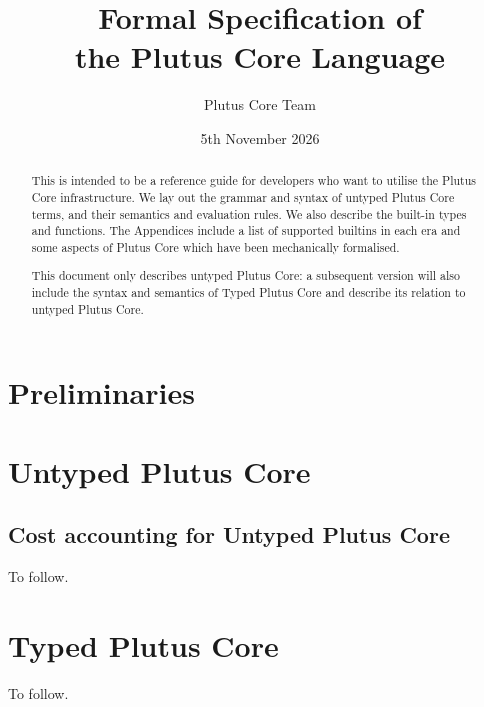 \documentclass[a4paper]{report}
\title{Formal Specification of\\the Plutus Core Language\\
  \vspace{5mm}
}
\date{5th November 2026}
\author{Plutus Core Team}
\begin{document}
\maketitle

\begin{abstract}
  This is intended to be a reference guide for developers who want to utilise
  the Plutus Core infrastructure.  We lay out the grammar and syntax of untyped
  Plutus Core terms, and their semantics and evaluation rules.  We also describe
  the built-in types and functions.  The Appendices include a list of supported
  builtins in each era and some aspects of Plutus Core which have been
  mechanically formalised.

  This document only describes untyped Plutus Core: a subsequent version will also
  include the syntax and semantics of Typed Plutus Core and describe its relation to
  untyped Plutus Core.
\end{abstract}

\newpage
\tableofcontents
\newpage



\chapter{Preliminaries}


\chapter{Untyped Plutus Core}



\section{Cost accounting for Untyped Plutus Core}
To follow.
\chapter{Typed Plutus Core}
To follow.

\begin{appendices}



\end{appendices}

\newpage


\newpage
\printnomenclature[2cm]  %
\end{document}
